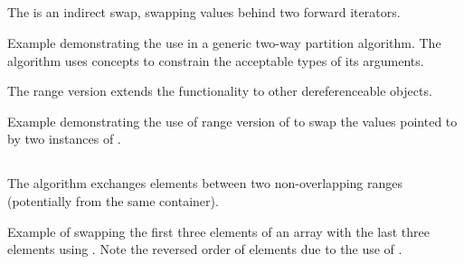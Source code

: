\subsection{\texorpdfstring{}{\texttt{std::iter\_swap}}}

The  is an indirect swap, swapping values behind two forward iterators.



\begin{codebox}[]{\href{https://compiler-explorer.com/z/77enEEh4c}{\ExternalLink}}
\footnotesize Example demonstrating the use  in a generic two-way partition algorithm. The algorithm uses concepts to constrain the acceptable types of its arguments.
\tcblower
{}
\end{codebox}

The range version extends the functionality to other dereferenceable objects.

\begin{codebox}[]{\href{https://compiler-explorer.com/z/bxeP3PPaE}{\ExternalLink}}
\footnotesize Example demonstrating the use of range version of  to swap the values pointed to by two instances of .
\tcblower
{}
\end{codebox}

\subsection{\texorpdfstring{}{\texttt{std::swap\_ranges}}}

The  algorithm exchanges elements between two non-overlapping ranges (potentially from the same container).


\begin{codebox}[]{\href{https://compiler-explorer.com/z/aEPe66f1E}{\ExternalLink}}
\footnotesize Example of swapping the first three elements of an array with the last three elements using . Note the reversed order of elements due to the use of .
\tcblower
{}
\end{codebox}